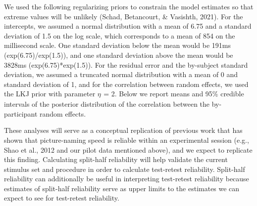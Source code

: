 \documentclass[
  man,floatsintext]{apa6}
\begin{document}
We used the following regularizing priors to constrain the model estimates so that extreme values will be unlikely (Schad, Betancourt, \& Vasishth, 2021). For the intercepts, we assumed a normal distribution with a mean of 6.75 and a standard deviation of 1.5 on the log scale, which corresponds to a mean of 854 on the millisecond scale. One standard deviation below the mean would be 191ms (exp(6.75)/exp(1.5)), and one standard deviation above the mean would be 3828ms (exp(6.75)*exp(1.5)). For the residual error and the by-subject standard deviation, we assumed a truncated normal distribution with a mean of 0 and standard deviation of 1, and for the correlation between random effects, we used the LKJ prior with parameter \(\eta_{}\) = 2. Below we report means and 95\% credible intervals of the posterior distribution of the correlation between the by-participant random effects.

These analyses will serve as a conceptual replication of previous work that has shown that picture-naming speed is reliable within an experimental session (e.g., Shao et al., 2012 and our pilot data mentioned above), and we expect to replicate this finding. Calculating split-half reliability will help validate the current stimulus set and procedure in order to calculate test-retest reliability. Split-half reliability can additionally be useful in interpreting test-retest reliability because estimates of split-half reliability serve as upper limits to the estimates we can expect to see for test-retest reliability.
\end{document}
